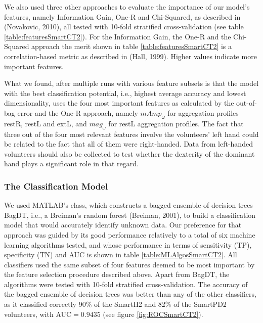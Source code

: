 We also used three other approaches to evaluate the importance of our model's features, namely Information Gain, One-R and Chi-Squared, as described in (Novakovic, 2010), all tested with 10-fold stratified cross-validation (see table \ref{table:featuresSmartCT2}). For the Information Gain, the One-R and the Chi-Squared approach the merit shown in table \ref{table:featuresSmartCT2} is a correlation-based metric as described in (Hall, 1999). Higher values indicate more important features. 

What we found, after multiple runs with various feature subsets is that the model with the best classification potential, i.e., highest average accuracy and lowest dimensionality, uses the four most important features as calculated by the out-of-bag error and the One-R approach, namely $mAmp_{\omega}$ for aggregation profiles restR, restL and extL, and $mag_{\omega}$ for restL aggregation profiles. The fact that three out of the four most relevant features involve the volunteers' left hand could be related to the fact that all of them were right-handed. Data from left-handed volunteers should also be collected to test whether the dexterity of the dominant hand plays a significant role in that regard.

\subsubsection{The Classification Model}
\label{subsubsec:PenCTClassification}
We used MATLAB's  class, which constructs a bagged ensemble of decision trees BagDT, i.e., a Breiman's random forest (Breiman, 2001), to build a classification model that would accurately identify unknown data. Our preference for that approach was guided by its good performance relatively to a total of six machine learning algorithms tested, and whose performance in terms of sensitivity (\gls{TP}), specificity (\gls{TN}) and \gls{AUC} is shown in table \ref{table:MLAlgosSmartCT2}. All classifiers used the same subset of four features deemed to be most important by the feature selection procedure described above. Apart from BagDT, the algorithms were tested with 10-fold stratified cross-validation.
The accuracy of the bagged ensemble of decision trees was better than any of the other classifiers, as it classified correctly 90\% of the \gls{SmartH2} and 82\% of the \gls{SmartPD2} volunteers, with \gls{AUC}$ = 0.9435$ (see figure \ref{fig:ROCSmartCT2}).

